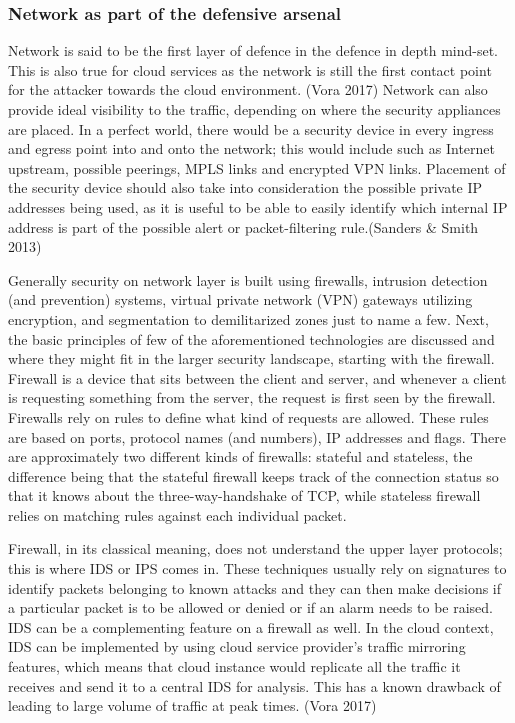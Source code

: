 \documentclass{article}
\begin{document}
\subsubsection{Network as part of the defensive arsenal}
Network is said to be the first layer of defence in the defence in depth mind-set. This is also true for cloud services as the network is still the first contact point for the attacker towards the cloud environment. (Vora 2017)
Network can also provide ideal visibility to the traffic, depending on where the security appliances are placed. In a perfect world, there would be a security device in every ingress and egress point into and onto the network; this would include such as Internet upstream, possible peerings, MPLS links and encrypted VPN links. Placement of the security device should also take into consideration the possible private IP addresses being used, as it is useful to be able to easily identify which internal IP address is part of the possible alert or packet-filtering rule.(Sanders \& Smith 2013)
\par
Generally security on network layer is built using firewalls, intrusion detection (and prevention) systems, virtual private network (VPN) gateways utilizing encryption, and segmentation to demilitarized zones just to name a few. Next, the basic principles of few of the aforementioned technologies are discussed and where they might fit in the larger security landscape, starting with the firewall. Firewall is a device that sits between the client and server, and whenever a client is requesting something from the server, the request is first seen by the firewall. Firewalls rely on rules to define what kind of requests are allowed. These rules are based on ports, protocol names (and numbers), IP addresses and flags. There are approximately two different kinds of firewalls: stateful and stateless, the difference being that the stateful firewall keeps track of the connection status so that it knows about the three-way-handshake of TCP, while stateless firewall relies on matching rules against each individual packet.
\par
Firewall, in its classical meaning, does not understand the upper layer protocols; this is where IDS or IPS comes in. These techniques usually rely on signatures to identify packets belonging to known attacks and they can then make decisions if a particular packet is to be allowed or denied or if an alarm needs to be raised. IDS can be a complementing feature on a firewall as well. In the cloud context, IDS can be implemented by using cloud service provider's traffic mirroring features, which means that cloud instance would replicate all the traffic it receives and send it to a central IDS for analysis. This has a known drawback of leading to large volume of traffic at peak times. (Vora 2017)
\end{document}
